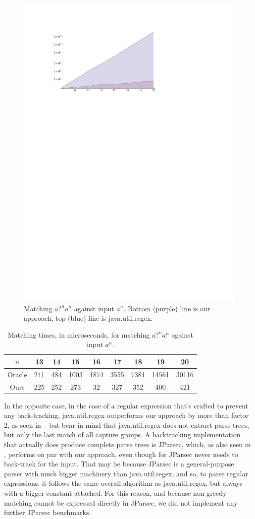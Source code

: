 \documentclass[english]{sigplanconf}
\theoremstyle{definition}
\begin{document}
\begin{figure}[h]
\includegraphics[width=0.75\linewidth]{graphs/pathological}
\caption{ Matching $\textit{a?}^n\textit{a}^n$ against input $\textit{a}^n$. Bottom (purple) line is our approach, top (blue) line is java.util.regex.}
\end{figure}

\begin{table}
\begin{tabular}{ccccccccc|}
\hline 
$n$ & 13 & 14 & 15 & 16 & 17 & 18 & 19 & 20\tabularnewline
\hline 
\hline 
Oracle & 241 & 484 & 1003 & 1874 & 3555 & 7381 & 14561 & 30116\tabularnewline
\hline 
Ours & 225 & 252 & 273 & 32 & 327 & 352 & 400 & 421\tabularnewline
\hline 
\end{tabular}
\caption{Matching times, in microseconds, for matching $\textit{a?}^n\textit{a}^n$ against input $\textit{a}^n$.}
\end{table}

In the opposite case, in the case of a regular expression that's
crafted to prevent any back-tracking, java.util.regex outperforms
our approach by more than factor 2, as seen in  -- but
bear in mind that java.util.regex does not extract parse trees, but
only the last match of all capture groups.  A backtracking
implementation that actually does produce complete parse trees is
JParsec, which, as also seen in , performs on par with
our approach, even though for JParsec never needs to back-track for
the input. That may be because JParsec is a general-purpose parser
with much bigger machinery than java.util.regex, and so, to parse
regular expressions, it follows the same overall algorithm as
java.util.regex, but always with a bigger constant attached.  For
this reason, and because non-greedy matching cannot be expressed
directly in JParsec, we did not implement any further JParsec
benchmarks.
\end{document}
